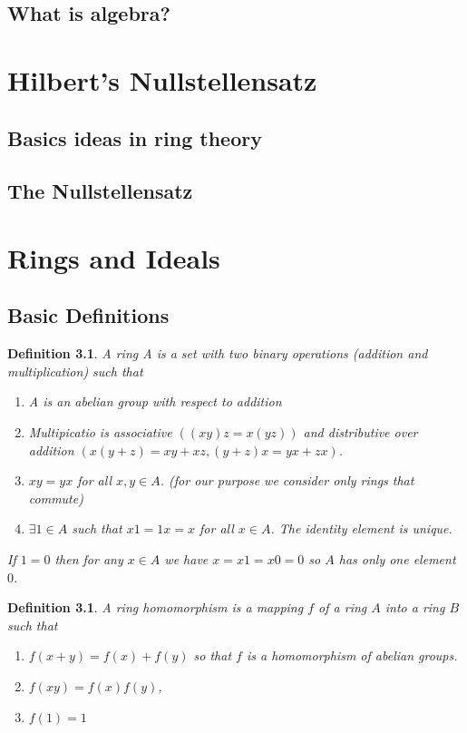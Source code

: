 \documentclass[]{report}
\newtheorem{defn}[theorem]{Definition}
\begin{document}
\section{What is algebra?}




\chapter{Hilbert's Nullstellensatz}
\section{Basics ideas in ring theory} %
\section{The Nullstellensatz}

\chapter{Rings and Ideals}
\section{Basic Definitions}
\begin{defn} 
    A ring A is a set with two binary operations (addition and multiplication) such that
\begin{enumerate}
    \item A is an abelian group with respect to addition
    \item Multipicatio is associative $((xy)z = x(yz))$ and distributive over addition $(x(y+z) = xy+xz, (y+z)x = yx + zx)$.  
    \item $xy=yx$ for all $x,y\in A$. (for our purpose we consider only rings that commute)
    \item $\exists 1\in A$ such that $x1 = 1x = x$ for all $x\in A$. 
The identity element is unique. 
\end{enumerate}

If $1=0$ then for any $x\in A$ we have $x=x1=x0 =0$ so $A$ has only one element $0$.
\end{defn}

\begin{defn} A ring homomorphism is a mapping $f$ of a ring $A$ into a ring $B$ such that
    \begin{enumerate}
        \item $f(x+y) = f(x) + f(y)$ so that $f$ is a homomorphism of abelian groups.
        \item $f(xy) = f(x)f(y)$,
        \item $f(1) = 1$
    \end{enumerate}
\end{defn}
\end{document}
